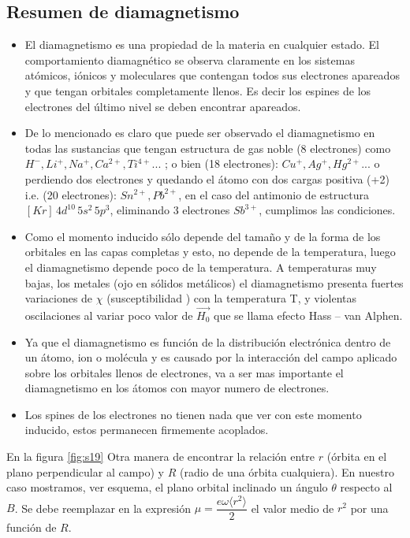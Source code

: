 \subsection{Resumen de diamagnetismo}

\begin{itemize}
	\item El diamagnetismo es una propiedad de la materia en cualquier estado. El comportamiento diamagnético se observa claramente en los sistemas atómicos, iónicos y moleculares que contengan todos sus electrones apareados y que tengan orbitales completamente llenos. Es decir los espines de los electrones del último nivel se deben encontrar apareados.

	\item De lo mencionado es claro que puede ser observado el diamagnetismo en todas las sustancias que tengan estructura de gas noble (8 electrones) como $H^{-}, Li^{+}, Na^{+}, Ca^{2+}, Ti^{4+}$... ; o bien (18 electrones): $Cu^{+}, Ag^{+}, Hg^{2+}$... o perdiendo dos electrones y quedando el átomo con dos cargas positiva (+2) i.e. (20 electrones): $Sn^{2+}, Pb^{2+}$, en el caso del antimonio de estructura $[Kr]\, 4d^{10}\, 5s^{2}\, 5p^{3}$, eliminando 3 electrones $Sb^{3+}$, cumplimos las condiciones.
	
	\item Como el momento inducido sólo depende del tamaño y de la forma de los orbitales en las capas completas y esto, no depende de la temperatura, luego el diamagnetismo depende poco de la temperatura. A temperaturas muy bajas, los metales (ojo en sólidos metálicos) el diamagnetismo presenta fuertes variaciones de $\chi$ (susceptibilidad ) con la temperatura T, y violentas oscilaciones al variar poco valor de $\overrightarrow{H_{0}}$ que se llama efecto Hass – van Alphen.

	\item Ya que el diamagnetismo es función de la distribución electrónica dentro de un átomo, ion o molécula y es causado por la interacción del campo aplicado sobre los orbitales llenos de electrones, va a ser mas importante el diamagnetismo en los átomos con mayor numero de electrones.

	\item Los spines de los electrones no tienen nada que ver con este momento inducido, estos permanecen firmemente acoplados.
\end{itemize}

En la figura \ref{fig:s19} Otra manera de encontrar la relación entre $r$ (órbita en el plano perpendicular al campo) y $R$ (radio de una órbita cualquiera). En nuestro caso mostramos, ver esquema, el plano orbital inclinado un ángulo $\theta$ respecto al $B$. Se debe reemplazar en la expresión $\mu=\dfrac{e\omega \langle r^{2} \rangle}{2}$ el valor medio de $r^{2}$ por una función de $R$.

